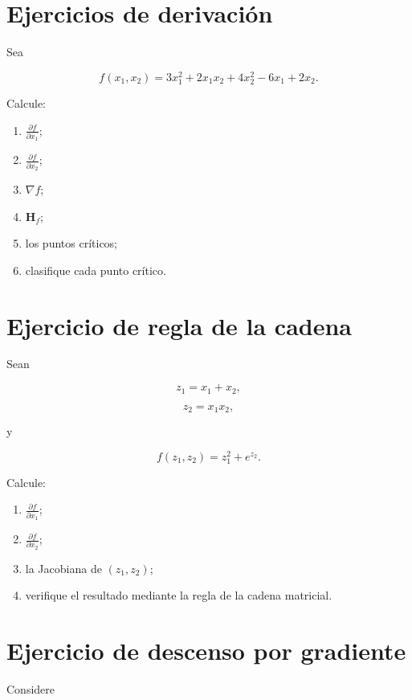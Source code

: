 \documentclass[
  spanish,
  11pt,
  letterpaper,
  DIV=11,
  numbers=noendperiod]{scrreprt}
\providecommand{\tightlist}{%
  \setlength{\itemsep}{0pt}\setlength{\parskip}{0pt}}
\theoremstyle{definition}
\theoremstyle{plain}
\theoremstyle{definition}
\theoremstyle{remark}
\begin{document}
\section{Ejercicios de derivación}\label{ejercicios-de-derivaciuxf3n}

Sea

\[
f(x_1,x_2)
=
3x_1^2
+
2x_1x_2
+
4x_2^2
-
6x_1
+
2x_2.
\]

Calcule:

\begin{enumerate}
\def\labelenumi{\arabic{enumi}.}
\tightlist
\item
  \(\frac{\partial f}{\partial x_1}\);
\item
  \(\frac{\partial f}{\partial x_2}\);
\item
  \(\nabla f\);
\item
  \(\mathbf{H}_f\);
\item
  los puntos críticos;
\item
  clasifique cada punto crítico.
\end{enumerate}

\section{Ejercicio de regla de la
cadena}\label{ejercicio-de-regla-de-la-cadena}

Sean

\[
z_1=x_1+x_2,
\]

\[
z_2=x_1x_2,
\]

y

\[
f(z_1,z_2)
=
z_1^2+e^{z_2}.
\]

Calcule:

\begin{enumerate}
\def\labelenumi{\arabic{enumi}.}
\tightlist
\item
  \(\frac{\partial f}{\partial x_1}\);
\item
  \(\frac{\partial f}{\partial x_2}\);
\item
  la Jacobiana de \((z_1,z_2)\);
\item
  verifique el resultado mediante la regla de la cadena matricial.
\end{enumerate}

\section{Ejercicio de descenso por
gradiente}\label{ejercicio-de-descenso-por-gradiente}

Considere
\end{document}
